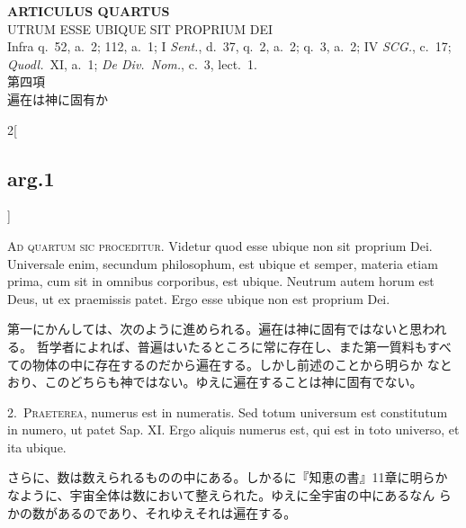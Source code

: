 \documentclass[paper=a4paper,fontsize=10pt,jafontsize=9pt,titlepage]{jlreq}
\begin{document}
\begin{center}
 {\Large {\bfseries ARTICULUS QUARTUS}}\\
 {\large UTRUM ESSE UBIQUE SIT PROPRIUM DEI}\\
 {\footnotesize Infra q.~52, a.~2; 112, a.~1; I {\itshape Sent.}, d.~37,
 q.~2, a.~2; q.~3, a.~2; IV {\itshape SCG.}, c.~17; {\itshape
 Quodl.}~XI, a.~1; {\itshape De Div.~Nom.}, c.~3, lect.~1.}\\
 {\Large 第四項\\遍在は神に固有か}
\end{center}

{}
\setcounter{section}{4}
\setcounter{subsection}{0}

\begin{paracol}{2}[\subsection{arg.1}]

{\huge A}{\scshape d quartum sic proceditur}. Videtur quod esse ubique non sit
 proprium Dei. Universale enim, secundum philosophum, est ubique et
 semper, materia etiam prima, cum sit in omnibus corporibus, est
 ubique. Neutrum autem horum est Deus, ut ex praemissis patet. Ergo esse
 ubique non est proprium Dei.

\switchcolumn

第一にかんしては、次のように進められる。遍在は神に固有ではないと思われる。
 哲学者によれば、普遍はいたるところに常に存在し、また第一質料もすべ
 ての物体の中に存在するのだから遍在する。しかし前述のことから明らか
 なとおり、このどちらも神ではない。ゆえに遍在することは神に固有でない。


2.~{\scshape Praeterea}, numerus est in numeratis. Sed totum universum est
 constitutum in numero, ut patet Sap. XI. Ergo aliquis numerus est, qui
 est in toto universo, et ita ubique.

\switchcolumn

さらに、数は数えられるものの中にある。しかるに『知恵の書』11章に明らか
 なように、宇宙全体は数において整えられた。ゆえに全宇宙の中にあるなん
 らかの数があるのであり、それゆえそれは遍在する。



\end{paracol}
\end{document}
